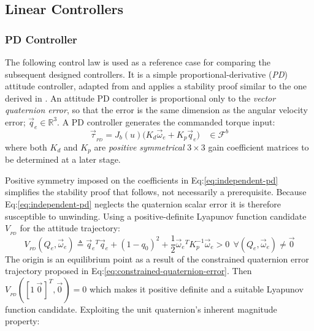 \subsection{Linear Controllers}
\label{subsec:control.attitude.controllers}
\subsubsection{PD Controller}
\label{subsubsec:control.attitude.controllers.pd}
The following control law is used as a reference case for comparing the subsequent designed controllers. It is a simple proportional-derivative (\emph{PD}) attitude controller, adapted from \cite{fullquaternion} and applies a stability proof similar to the one derived in \cite{attitudecontrolproblem}. An attitude PD controller is proportional only to the \emph{vector quaternion error}, so that the error is the same dimension as the angular velocity error; $\vec{q}_e\in\mathbb{R}^3$. A PD controller generates the commanded torque input:
\begin{equation}\label{eq:independent-pd}
\vec{\tau}_{_{PD}}=J_b(u)\big(K_d\vec{\omega}_e+K_p\vec{q}_e\big)~~~~\in\mathcal{F}^b
\end{equation}
where both $K_d$ and $K_p$ are \emph{positive symmetrical} $3\times 3$ gain coefficient matrices to be determined at a later stage.
\par
Positive symmetry imposed on the coefficients in Eq:\ref{eq:independent-pd} simplifies the stability proof that follows, not necessarily a prerequisite. Because Eq:\ref{eq:independent-pd} neglects the quaternion scalar error it is therefore susceptible to unwinding. Using a positive-definite Lyapunov function candidate $V_{_{PD}}$ for the attitude trajectory:
\begin{equation}\label{eq:lyapunov-pd}
V_{_{PD}}(Q_e,\vec{\omega}_e)\triangleq\vec{q}_e\text{}^T\vec{q}_e+(1-q_0)^2+\frac{1}{2}\vec{\omega}_e\text{}^TK_p^{-1}\vec{\omega}_e>0~~\forall(Q_e,\vec{\omega}_e)\not = \vec{0}
\end{equation}
The origin is an equilibrium point as a result of the constrained quaternion error trajectory proposed in Eq:\ref{eq:constrained-quaternion-error}. Then $V_{_{PD}}([1~\vec{0}\hspace{1pt}]^T,\vec{0}\hspace{1pt})=0$ which makes it positive definite and a suitable Lyapunov function candidate. Exploiting the unit quaternion's inherent magnitude property:

